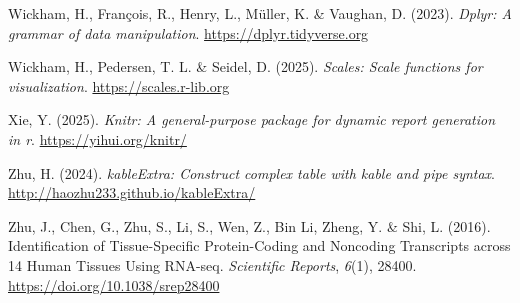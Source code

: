 \documentclass[
  letterpaper,
  DIV=11,
  numbers=noendperiod]{scrartcl}
\newlength{\cslhangindent}
\newenvironment{CSLReferences}[2] %
 {\begin{list}{}{%
  \setlength{\itemindent}{0pt}
  \setlength{\leftmargin}{0pt}
  \setlength{\parsep}{0pt}
  \ifodd #1
   \setlength{\leftmargin}{\cslhangindent}
   \setlength{\itemindent}{-1\cslhangindent}
  \fi
  \setlength{\itemsep}{#2\baselineskip}}}
 {\end{list}}
\begin{document}
\begin{CSLReferences}{1}{0}
Wickham, H., François, R., Henry, L., Müller, K. \& Vaughan, D. (2023).
\emph{Dplyr: A grammar of data manipulation}.
\url{https://dplyr.tidyverse.org}

Wickham, H., Pedersen, T. L. \& Seidel, D. (2025). \emph{Scales: Scale
functions for visualization}. \url{https://scales.r-lib.org}

Xie, Y. (2025). \emph{Knitr: A general-purpose package for dynamic
report generation in r}. \url{https://yihui.org/knitr/}

Zhu, H. (2024). \emph{kableExtra: Construct complex table with kable and
pipe syntax}. \url{http://haozhu233.github.io/kableExtra/}

Zhu, J., Chen, G., Zhu, S., Li, S., Wen, Z., Bin Li, Zheng, Y. \& Shi,
L. (2016). Identification of Tissue-Specific Protein-Coding and
Noncoding Transcripts across 14 Human Tissues Using RNA-seq.
\emph{Scientific Reports}, \emph{6}(1), 28400.
\url{https://doi.org/10.1038/srep28400}

\end{CSLReferences}
\end{document}
